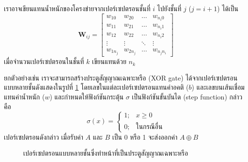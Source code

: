 เราอาจเขียนแทนน้ำหนักของโครงข่ายจากเปอร์เซปตรอนชั้นที่ $i$ ไปยังชั้นที่ $j$ ($j=i+1$) ได้เป็น
\begin{equation*}
    \boldsymbol{W}_{ij} = 
    \begin{bmatrix}
        w_{10} & w_{20} & \dots & w_{n_{i}0}\\
        w_{11} & w_{21} & \dots & w_{n_{i}1}\\
        w_{12} & w_{22} & \dots & w_{n_{i}2}\\
        \vdots & \vdots & \ddots & \vdots\\
        w_{1n_j} & w_{2n_j} & \dots & w_{n_jn_i}
    \end{bmatrix}
\end{equation*}
เมื่อจำนวนเปอร์เซปตรอนในชั้นที่ $k$ เขียนแทนด้วย $n_k$

ยกตัวอย่างเช่น เราจะสามารถสร้างประตูสัญญาณเฉพาะหรือ (XOR gate) ได้จากเปอร์เซปตรอนแบบหลายชั้นดังแสดงในรูปที่ \ref{xor-mlp} โดยเลขในแต่ละเปอร์เซปตรอนแทนค่าอคติ ($b$) และเลขบนเส้นเชื่อมแทนค่าน้ำหนัก ($w$) และกำหนดให้ฟังก์ชันกระตุ้น $\sigma$ เป็นฟังก์ชันขั้นบันได (step function) กล่าวคือ
\begin{equation*}
    \sigma(x) =
    \begin{cases}
        1; & x \geq 0\\
        0; & \textrm{ในกรณีอื่น}
    \end{cases}
\end{equation*}
เปอร์เซปตรอนดังกล่าว เมื่อรับค่า $A$ และ $B$ เป็น 0 หรือ 1 จะส่งออกค่า $A \oplus B$

\begin{figure}
    \def\layersep{2.5cm}
    \centering
    \caption{เปอร์เซปตรอนแบบหลายชั้นซึ่งทำหน้าที่เป็นประตูสัญญาณเฉพาะหรือ}
    \label{xor-mlp}
\end{figure}

